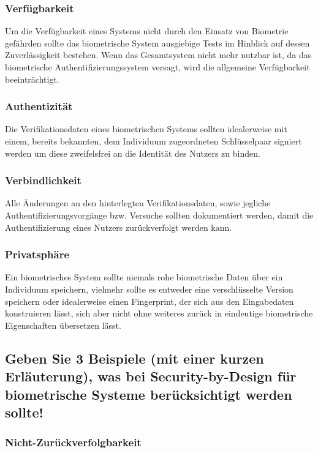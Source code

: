 \documentclass{article}
\begin{document}
\subsubsection*{Verfügbarkeit}

Um die Verfügbarkeit eines Systems nicht durch den Einsatz von Biometrie gefährden sollte das biometrische 
System ausgiebige Tests im Hinblick auf dessen Zuverlässigkeit bestehen. Wenn das Gesamtsystem nicht mehr
nutzbar ist, da das biometrische Authentifizierungssystem versagt, wird die allgemeine Verfügbarkeit 
beeinträchtigt.

\subsubsection*{Authentizität}

Die Verifikationsdaten eines biometrischen Systems sollten idealerweise mit einem, bereits bekannten, dem 
Individuum zugeordneten Schlüsselpaar signiert werden um diese zweifelsfrei an die Identität des Nutzers 
zu binden.

\subsubsection*{Verbindlichkeit}

Alle Änderungen an den hinterlegten Verifikationsdaten, sowie jegliche Authentifizierungsvorgänge bzw. 
Versuche sollten dokumentiert werden, damit die Authentifizierung eines Nutzers zurückverfolgt werden 
kann.

\subsubsection*{Privatsphäre}

Ein biometrisches System sollte niemals rohe biometrische Daten über ein Individuum speichern, vielmehr 
sollte es entweder eine verschlüsselte Version speichern oder idealerweise einen Fingerprint, der sich aus 
den Eingabedaten konstruieren lässt, sich aber nicht ohne weiteres zurück in eindeutige biometrische 
Eigenschaften übersetzen lässt.

\subsection{Geben Sie 3 Beispiele (mit einer kurzen Erläuterung), was bei Security-by-Design für biometrische Systeme berücksichtigt werden sollte!}

\subsubsection*{Nicht-Zurückverfolgbarkeit}
\end{document}

